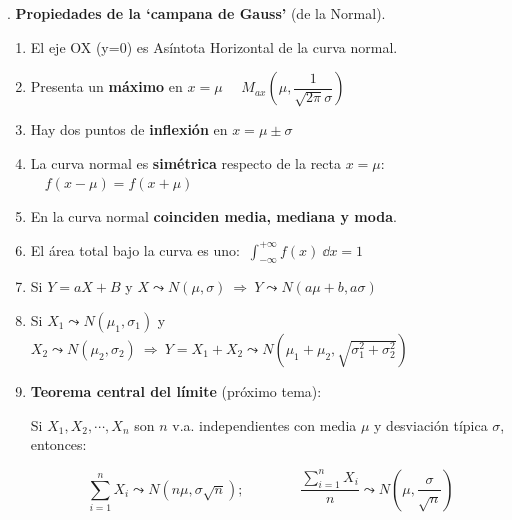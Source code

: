 \begin{theorem}
.	\textbf{Propiedades de la `campana de Gauss'} (de la Normal).

\begin{enumerate}
\item El eje OX (y=0) es Asíntota Horizontal de la curva normal.
\item Presenta un \textbf{máximo} en $x=\mu$ \textcolor{gris}{$\quad M_{ax} \left( \mu, \dfrac {1}{\sqrt{2\pi}\sigma} \right) $}
\item Hay dos puntos de \textbf{inflexión} en $x=\mu \pm \sigma$
\item La curva normal es \textbf{simétrica} respecto de la recta $x=\mu$: $\quad f(x-\mu)=f(x+\mu)$
\item En la curva normal \textbf{coinciden media, mediana y moda}.
\item El área total bajo la curva es uno: $\ \displaystyle \int_{-\infty}^{+\infty} f(x)\ \dd x=1$
\item \textcolor{gris}{ Si $Y=aX+B$ y $X\leadsto N(\mu,\sigma) \ \Rightarrow \ Y\leadsto N(a\mu +b, a\sigma)$ }
\item \textcolor{gris}{ Si $X_1\leadsto N(\mu_1,\sigma_1)$ y $X_2\leadsto N(\mu_2,\sigma_2) \ \Rightarrow \ Y=X_1+X_2\leadsto N(\mu_1+\mu_2, \sqrt{\sigma_1^2+\sigma_2^2})$ }
\item \textcolor{gris}{ \textbf{Teorema central del límite} (próximo tema):  }

\textcolor{gris}{Si $X_1,X_2,\cdots ,X_n $ son $n$ v.a. independientes con media $\mu$ y desviación típica $\sigma$, entonces:}

\textcolor{gris}{
$$\displaystyle \sum_{i=1}^n X_i \leadsto N(n\mu, \sigma \sqrt
n);\qquad \qquad  \dfrac{\sum_{i=1}^n X_i}{n} \leadsto N \left( \mu, \dfrac{\sigma}{\sqrt{n}} \right)  $$
}
\end{enumerate}	
\end{theorem}
	
